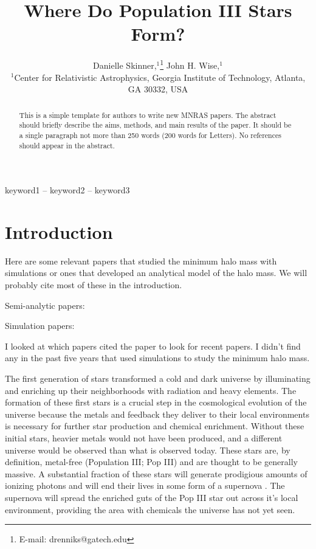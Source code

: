 \documentclass[a4paper,fleqn,usenatbib]{mnras}
\title[Where Do Pop III Stars Form?]{Where Do Population III Stars Form?}
\author[Danielle Skinner et al.]{
Danielle Skinner,$^{1}$\thanks{E-mail: drenniks@gatech.edu}
John H. Wise,$^{1}$
\\
$^{1}$Center for Relativistic Astrophysics, Georgia Institute of Technology, 
Atlanta, GA 30332, USA\\
}
\begin{document}
\label{firstpage}
\pagerange{\pageref{firstpage}--\pageref{lastpage}}
\maketitle

\begin{abstract}
This is a simple template for authors to write new MNRAS papers.
The abstract should briefly describe the aims, methods, and main results of the 
paper.
It should be a single paragraph not more than 250 words (200 words for Letters).
No references should appear in the abstract.
\end{abstract}

\begin{keywords}
keyword1 -- keyword2 -- keyword3
\end{keywords}



\section{Introduction}

\noindent Here are some relevant papers that studied the minimum halo
mass with simulations or ones that developed an analytical model of
the halo mass.  We will probably cite most of these in the
introduction.

\lli Semi-analytic papers: \citep{Tegmark97, Trenti09, Visbal18,
  Mebane18, Griffen18}

\lli Simulation papers: \citep{Machacek01, Yoshida03, Wise07_UVB,
  OShea08, Muratov13}

 I looked at which papers cited the \citet{Machacek01}
paper to look for recent papers.  I didn't find any in the past five
years that used simulations to study the minimum halo mass.

\medskip

The first generation of stars transformed a cold and dark universe
by illuminating and enriching up their neighborhoods with radiation
and heavy elements. The formation of these first stars is a crucial step in the cosmological evolution of the universe because the metals and feedback they deliver to their local environments is necessary for further star production and chemical enrichment. Without these initial stars, heavier metals would not have been produced, and a different universe would be observed than what is observed today. These stars are, by definition, metal-free (Population III; Pop III) and are thought to be generally massive. A substantial fraction of these stars will generate prodigious amounts of ionizing photons and will end their lives in some form of a supernova \citep[e.g.][]{Schaerer02, Heger02}. The supernova will spread the enriched guts of the Pop III star out across it's local environment, providing the area with chemicals the universe has not yet seen. 
\end{document}
